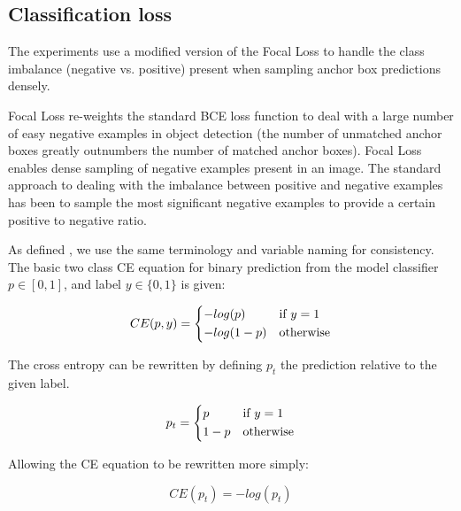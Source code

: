 \subsection {Classification loss}
\label{sec:loss}

The experiments use a modified version of the Focal Loss \cite{Lin2017} to handle the class imbalance (negative vs. positive) present when sampling anchor box predictions densely.

Focal Loss \cite{Lin2017} re-weights the standard \gls{BCE} loss function to deal with a large number of easy negative examples in object detection (the number of unmatched anchor boxes greatly outnumbers the number of matched anchor boxes). Focal Loss enables dense sampling of negative examples present in an image. The standard approach to dealing with the imbalance between positive and negative examples has been to sample the most significant negative examples to provide a certain positive to negative ratio.

As defined \cite{Lin2017}, we use the same terminology and variable naming for consistency. The basic two class \gls{CE} equation for binary prediction from the model classifier $p \in \left[0, 1\right]$, and label $y \in \{0, 1\}$  is given:

\begin{equation}
CE(p, y) = 
  \begin{cases*}
  -log(p) & if $y = 1$\\
  -log(1-p) & otherwise\\
  \end{cases*}
\label{eq:cross_entropy}
\end{equation}


The cross entropy can be rewritten by defining $p_t$ the prediction relative to the given label.

\begin{equation}
p_t = 
  \begin{cases*}
  p & if $y = 1$\\
  1 - p & otherwise\\
  \end{cases*}
\label{eq:class_prob}
\end{equation}

Allowing the \gls{CE} equation to be rewritten more simply:

\begin{equation}
CE(p_t) = -log(p_t)
\label{eq:short_cross_entropy}
\end{equation}


